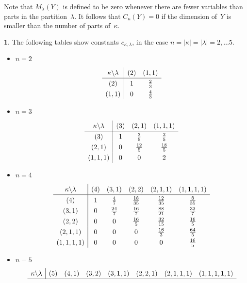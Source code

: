 \documentclass[10pt,oneside,american]{amsart}
\numberwithin{equation}{section}
\numberwithin{figure}{section}
\theoremstyle{plain}
\theoremstyle{definition}
\theoremstyle{remark}
\theoremstyle{plain}
\theoremstyle{definition}
\newtheorem{example}[thm]{\protect\examplename}
\theoremstyle{plain}
\theoremstyle{plain}
\providecommand{\examplename}{Example}
\begin{document}
Note that $M_\lambda(Y)$ is defined to be zero whenever there are fewer variables
than parts in the partition~$\lambda$. It follows that $C_{\kappa}(Y)=0$ if the
dimension of~$Y$ is smaller than the number of parts of~$\kappa$.
\begin{example}
\label{Tables}The following tables \cite[p.~238]{Muirhead} show
constants $c_{\kappa,\lambda}$, in the case $n=\left|\kappa\right|=\left|\lambda\right|=2,\ldots5$. 
\begin{itemize}
\item $n=2$
\[
\def\arraystretch{1.3}
\begin{array}{c|cc}
\kappa\backslash\lambda & \left(2\right) & \left(1,1\right)\\ \hline
\left(2\right) & 1 & \frac{2}{3}\\
\left(1,1\right) & 0 & \frac{4}{3}
\end{array}
\]
\item $n=3$
\[
\def\arraystretch{1.3}
\begin{array}{c|ccc}
\kappa\backslash\lambda & \left(3\right) & \left(2,1\right) & \left(1,1,1\right)\\ \hline
\left(3\right) & 1 & \frac{3}{5} & \frac{2}{5}\\
\left(2,1\right) & 0 & \frac{12}{5} & \frac{18}{5}\\
\left(1,1,1\right) & 0 & 0 & 2
\end{array}
\]
\item $n=4$
\[
\def\arraystretch{1.3}
\begin{array}{c|ccccc}
\kappa\backslash\lambda & \left(4\right) & \left(3,1\right) & \left(2,2\right) & \left(2,1,1\right) & \left(1,1,1,1\right)\\ \hline
\left(4\right) & 1 & \frac{4}{7} & \frac{18}{35} & \frac{12}{35} & \frac{8}{35}\\
\left(3,1\right) & 0 & \frac{24}{7} & \frac{16}{7} & \frac{88}{21} & \frac{32}{7}\\
\left(2,2\right) & 0 & 0 & \frac{16}{5} & \frac{32}{15} & \frac{16}{5}\\
\left(2,1,1\right) & 0 & 0 & 0 & \frac{16}{3} & \frac{64}{5}\\
\left(1,1,1,1\right) & 0 & 0 & 0 & 0 & \frac{16}{5}
\end{array}
\]
\item $n=5$
\[
\def\arraystretch{1.3}
\begin{array}{c|ccccccc}
\kappa\backslash\lambda & \left(5\right) & \left(4,1\right) & \left(3,2\right) & \left(3,1,1\right) & \left(2,2,1\right) & \left(2,1,1,1\right) & \left(1,1,1,1,1\right)\\ \hline

\end{array}\]
\end{itemize}
\end{example}
\end{document}
